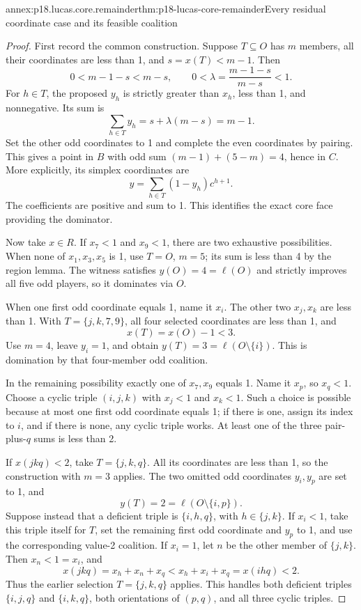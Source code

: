 \begin{annexitem}{annex:p18.lucas.core.remainder}{thm:p18-lucas-core-remainder}{Every residual coordinate case and its feasible coalition}
\begin{proof}
First record the common construction. Suppose \(T\subseteq O\)
has \(m\) members, all their coordinates are less than 1,
and \(s=x(T)<m-1\). Then
\[
 0<m-1-s<m-s,\qquad
 0<\lambda=\frac{m-1-s}{m-s}<1.
\]
For \(h\in T\), the proposed \(y_h\) is strictly greater
than \(x_h\), less than 1, and nonnegative. Its sum is
\[
                \sum_{h\in T}y_h=s+\lambda(m-s)=m-1.
\]
Set the other odd coordinates to 1 and complete the even
coordinates by pairing. This gives a point in \(B\) with
odd sum \((m-1)+(5-m)=4\), hence in \(C\).
More explicitly, its simplex coordinates are
\[
                      y=\sum_{h\in T}(1-y_h)c^{h+1}.
\]
The coefficients are positive and sum to 1. This identifies
the exact core face providing the dominator.

Now take \(x\in R\). If \(x_7<1\) and \(x_9<1\), there
are two exhaustive possibilities. When none of
\(x_1,x_3,x_5\) is 1, use \(T=O\), \(m=5\);
its sum is less than 4 by the region lemma. The witness
satisfies \(y(O)=4=\ell(O)\) and strictly improves all five
odd players, so it dominates via \(O\).

When one first odd coordinate equals 1, name it \(x_i\).
The other two \(x_j,x_k\) are less than 1. With
\(T=\{j,k,7,9\}\), all four selected coordinates are less
than 1, and
\[
                        x(T)=x(O)-1<3.
\]
Use \(m=4\), leave \(y_i=1\), and obtain
\(y(T)=3=\ell(O\setminus\{i\})\). This is domination by
that four-member odd coalition.

In the remaining possibility exactly one of \(x_7,x_9\)
equals 1. Name it \(x_p\), so \(x_q<1\). Choose a cyclic
triple \((i,j,k)\) with \(x_j<1\) and \(x_k<1\).
Such a choice is possible because at most one first odd
coordinate equals 1; if there is one, assign its index to
\(i\), and if there is none, any cyclic triple works.
At least one of the three pair-plus-\(q\) sums is less
than 2.

If \(x(jkq)<2\), take \(T=\{j,k,q\}\).
All its coordinates are less than 1, so the construction
with \(m=3\) applies. The two omitted odd coordinates
\(y_i,y_p\) are set to 1, and
\[
                y(T)=2=\ell(O\setminus\{i,p\}).
\]
Suppose instead that a deficient triple is
\(\{i,h,q\}\), with \(h\in\{j,k\}\).
If \(x_i<1\), take this triple itself for \(T\), set the
remaining first odd coordinate and \(y_p\) to 1, and use
the corresponding value-2 coalition.
If \(x_i=1\), let \(n\) be the other member of \(\{j,k\}\).
Then \(x_n<1=x_i\), and
\[
                x(jkq)=x_h+x_n+x_q
                         <x_h+x_i+x_q=x(ihq)<2.
\]
Thus the earlier selection \(T=\{j,k,q\}\) applies.
This handles both deficient triples \(\{i,j,q\}\) and
\(\{i,k,q\}\), both orientations of \((p,q)\), and all
three cyclic triples.


\end{proof}
\end{annexitem}
